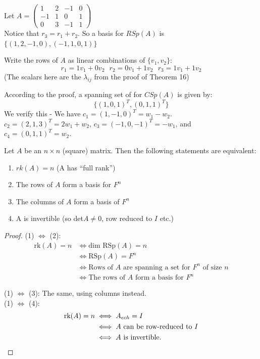 \documentclass[10pt]{scrartcl}
\begin{document}
\begin{example}Let $A = \left(\begin{smallmatrix}
 1 & 2 & -1 & 0\\ -1 & 1 & 0 & 1\\ 0 & 3 & -1 & 1
 \end{smallmatrix}\right)$\\
 
 Notice that $r_3 = r_1 + r_2$. So a basis for $RSp(A)$ is $\{(1,2,-1,0),(-1,1,0,1)\}$
 
 Write the rows of $A$ as linear combinations of $\{v_1,v_2\}$:
 \[r_1 = 1v_1 + 0v_2~~~ r_2 = 0v_1 + 1v_2~~~ r_3 = 1v_1 + 1v_2\] (The scalars here are the $\lambda_{ij}$ from the proof of Theorem 16)
 
 According to the proof, a spanning set of for $CSp(A)$ is given by: \[\{(1,0,1)^T,(0,1,1)^T\}\] We verify this - 
 We have $c_1 = (1,-1,0)^T = w_1 - w_2$. $c_2 = (2,1,3)^T = 2w_1 + w_2$, $c_3 = (-1,0,-1)^T = -w_1$, and $c_4 = (0,1,1)^T = w_2$.
 \end{example}\vspace*{5pt}

\begin{proposition} {\normalfont{} }
 Let $A$ be an $n \times n$ (square) matrix. Then the following statements are equivalent:
\begin{enumerate}
\item $rk(A) = n$ (A has ``full rank'')
\item The rows of $A$ form a basis for $F^n$
\item The columns of $A$ form a basis of $F^n$
\item A is invertible (so det$A \neq 0$, row reduced to $I$ etc.)
\end{enumerate}
\end{proposition}

\begin{proof}
(1) $\iff$ (2):\\
\[\begin{aligned}
\text{rk}(A) = n & \iff \text{dim RSp}(A) = n\\
&\iff \text{RSp}(A) = F^n\\
& \iff \text{Rows of } A \text{ are spanning a set for } F^n \text{ of size } n\\
& \iff \text{The rows of } A \text{ form a basis for }F^n
\end{aligned}
\]

(1) $\iff$ (3): The same, using columns instead.\\

(1) $\iff$ (4): 
\begin{align*}
\text{rk}(A) = n &\iff A_{ech} = I\\
&\iff A \text{ can be row-reduced to } I\\
&\iff A \text{ is invertible.}	\qedhere
\end{align*}
\end{proof}
\end{document}
